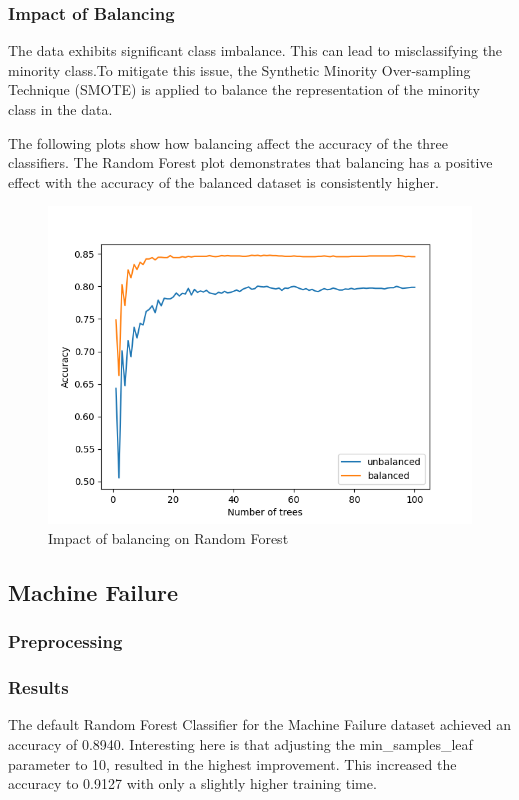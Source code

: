 \documentclass{article}
\begin{document}
\subsubsection{Impact of Balancing}
The data exhibits significant class imbalance. This can lead to misclassifying the minority class.To mitigate this issue, the Synthetic Minority Over-sampling Technique (SMOTE) is applied to balance the representation of the minority class in the data.

The following plots show how balancing affect the accuracy of the three classifiers. The Random Forest plot demonstrates that balancing has a positive effect with the accuracy of the balanced dataset is consistently higher.

\begin{figure}[H]
\centering
\includegraphics[width=0.5\linewidth]{RTA_balancing.png}
\caption{\label{fig:hist:price}Impact of balancing on Random Forest}
\end{figure}


\subsection{Machine Failure}
\subsubsection{Preprocessing}
\subsubsection{Results}

The default Random Forest Classifier for the Machine Failure dataset achieved an accuracy of 0.8940. Interesting here is that
adjusting the min\_samples\_leaf parameter to 10, resulted in the highest improvement. This increased the accuracy to 0.9127 with only a slightly higher training time.
\end{document}
